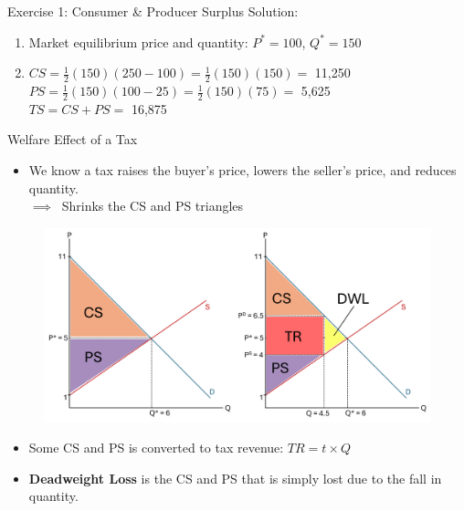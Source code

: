 \documentclass[9pt, handout]{beamer}
\begin{document}
\begin{frame}{Exercise 1: Consumer \& Producer Surplus}
    Solution: 
    \begin{enumerate}
        \item Market equilibrium price and quantity: $P^*=100$, $Q^*=150$
        \vspace{5pt}
        \item $CS = \frac{1}{2}(150)(250 - 100)=\frac{1}{2}(150)(150) =$ 11,250\\
        \vspace{5pt}
        $PS = \frac{1}{2}(150)(100 - 25) = \frac{1}{2}(150)(75) =$ 5,625\\
        \vspace{5pt}
        $TS = CS + PS =$ 16,875
    \end{enumerate}
\end{frame}

\begin{frame}{Welfare Effect of a Tax}
    \begin{itemize}
        \item We know a tax raises the buyer's price, lowers the seller's price, and reduces quantity.\\
        $\implies \:$ Shrinks the CS and PS triangles
    \end{itemize}
    \begin{figure}
        \centering
        \includegraphics[width=0.85\linewidth]{Picture4.png}
    \end{figure}
    \begin{itemize}
        \item Some CS and PS is converted to tax revenue: $TR = t \times Q$
        \item \textbf{Deadweight Loss} is the CS and PS that is simply lost due to the fall in quantity.
    \end{itemize}
\end{frame}
\end{document}
